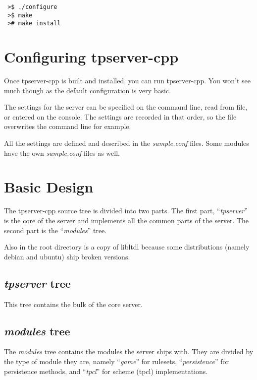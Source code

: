 \documentclass[a4paper,11pt]{report}
\newcommand{\filename}[1]{\emph{#1}}
\begin{document}
\begin{verbatim}
 >$ ./configure
 >$ make
 ># make install
\end{verbatim}

\chapter{Configuring tpserver-cpp}
\label{chap:configure}

Once tpserver-cpp is built and installed, you can run tpserver-cpp.  You won't see much though as the default configuration is very basic.

The settings for the server can be specified on the command line, read from file, or entered on the console. The settings are recorded in that order, so the file overwrites the command line for example.

All the settings are defined and described in the \filename{sample.conf} files. Some modules have the own \filename{sample.conf} files as well.

\chapter{Basic Design}
\label{chap:design-basic}

The tpserver-cpp source tree is divided into two parts. The first part, ``\filename{tpserver}'' is the core of the server and implements all the common parts of the server. The second part is the ``\filename{modules}'' tree.

Also in the root directory is a copy of libltdl because some distributions (namely debian and ubuntu) ship broken versions.

\section{\filename{tpserver} tree}
\label{sec:tree-tpserver}

This tree contains the bulk of the core server.

\section{\filename{modules} tree}
\label{sec:tree-modules}

The \filename{modules} tree contains the modules the server ships with. They are divided by the type of module they are, namely ``\filename{game}'' for rulesets, ``\filename{persistence}'' for persistence methods, and ``\filename{tpcl}'' for scheme (tpcl) implementations.
\end{document}
